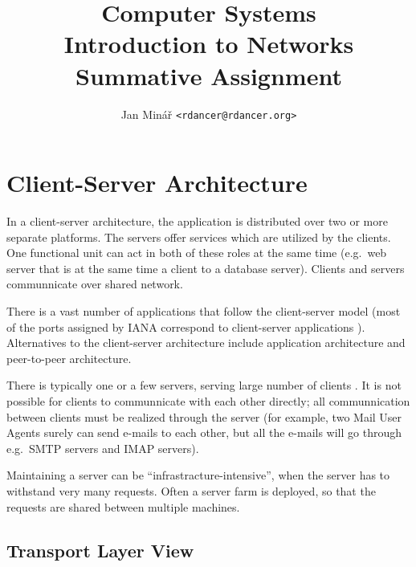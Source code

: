 \documentclass[10pt]{report}
\author{Jan Minář {\tt <rdancer@rdancer.org>}}
\title{Computer Systems\\Introduction to Networks\\Summative Assignment}
\begin{document}


\maketitle




\chapter{Client-Server Architecture}

In a client-server architecture, the application is distributed over two or
more separate platforms.  The servers offer services which are utilized by the
clients.  One functional unit can act in both of these roles at the same time
(e.g.\ web server that is at the same time a client to a database server).
Clients and servers communnicate over shared network. \cite[pp3--11]{vaughn}

There is a vast number of applications that follow the client-server model
(most of the ports assigned by IANA correspond to client-server applications
\cite{iana}).  Alternatives to the client-server architecture include
application architecture and peer-to-peer architecture.  \cite[p110]{kurose}

There is typically one or a few servers, serving large number of clients \cite[p110]{kurose}.  It is not possible for clients to communnicate with each other directly; all communnication between clients must be realized through the server (for example, two Mail User Agents surely can send e-mails to each other, but all the e-mails will go through e.g.\ SMTP servers and IMAP servers).

Maintaining a server can be ``infrastracture-intensive'', when the server has
to withstand very many requests.  Often a server farm is deployed, so that the
requests are shared between multiple machines.  \cite[p110]{kurose}

\section{Transport Layer View}
\end{document}
